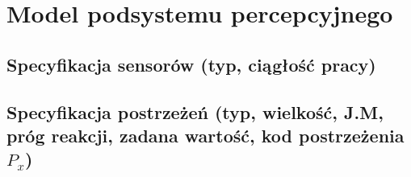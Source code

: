 \section{Model podsystemu percepcyjnego}
\subsection{Specyfikacja sensorów (typ, ciągłość pracy)}
\subsection{Specyfikacja postrzeżeń (typ, wielkość, J.M, próg reakcji, zadana wartość, kod postrzeżenia \(P_x\))}